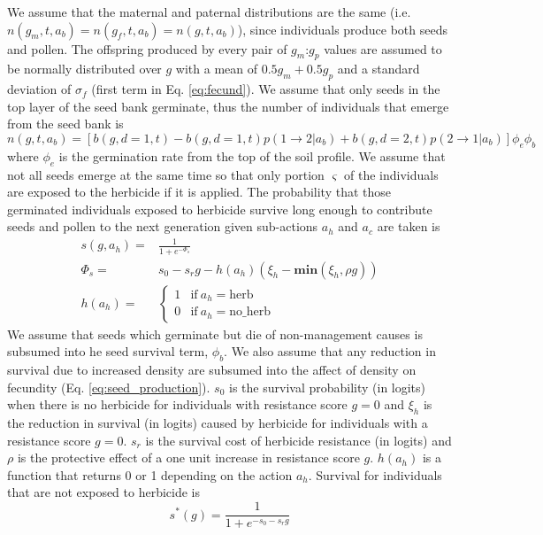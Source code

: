 \documentclass[12pt, a4paper]{article}
\begin{document}
We assume that the maternal and paternal distributions are the same (i.e. $n(g_m, t, a_b) = n(g_f, t, a_b) = n(g, t, a_b)$), since individuals produce both seeds and pollen. The offspring produced by every pair of $g_m$:$g_p$ values are assumed to be normally distributed over $g$ with a mean of $0.5g_m + 0.5g_p$ and a standard deviation of $\sigma_f$ (first term in Eq. \ref{eq:fecund}). We assume that only seeds in the top layer of the seed bank germinate, thus the number of individuals that emerge from the seed bank is
\begin{equation}\label{eq:above_ground}
	n(g, t, a_b) = [b(g, d = 1, t) - b(g, d = 1, t)p(1 \rightarrow 2|a_b) + b(g, d = 2, t)p(2 \rightarrow 1|a_b)]\phi_e\phi_b
\end{equation}
where $\phi_e$ is the germination rate from the top of the soil profile. We assume that not all seeds emerge at the same time so that only portion $\varsigma$ of the individuals are exposed to the herbicide if it is applied. The probability that those germinated individuals exposed to herbicide survive long enough to contribute seeds and pollen to the next generation given sub-actions $a_h$ and $a_c$ are taken is 
\begin{align}\label{eq:survival_herb}
	s(g, a_h) =& \frac{1}{1 + e^{-\Phi_s}}\\
	\Phi_s =& s_0 - s_rg - h(a_h)\left(\xi_h - \textbf{min}(\xi_h, \rho g) \right)\\
	h(a_h) =& \begin{cases}
		1 &\text{if}~a_h = \text{herb}\\
		0 &\text{if}~a_h = \text{no\_herb}
	\end{cases}
\end{align}
We assume that seeds which germinate but die of non-management causes is subsumed into he seed survival term, $\phi_b$. We also assume that any reduction in survival due to increased density are subsumed into the affect of density on fecundity (Eq. \ref{eq:seed_production}). $s_0$ is the survival probability (in logits) when there is no herbicide for individuals with resistance score $g = 0$ and $\xi_h$ is the reduction in survival (in logits) caused by herbicide for individuals with a resistance score $g = 0$. $s_r$ is the survival cost of herbicide resistance (in logits) and $\rho$ is the protective effect of a one unit increase in resistance score $g$. $h(a_h)$ is a function that returns 0 or 1 depending on the action $a_h$. Survival for individuals that are not exposed to herbicide is   
\begin{equation}\label{eq:survival_noherb}
	s^*(g) = \frac{1}{1 + e^{-s_0 - s_rg}}
\end{equation}
\end{document}
